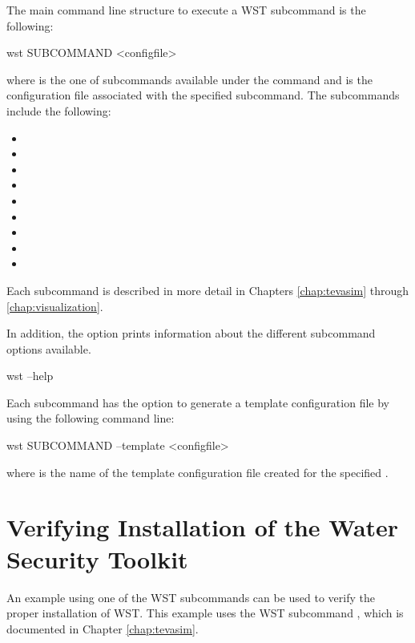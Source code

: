 The main command line structure to execute a WST subcommand is the following:
\begin{unknownListing}
wst SUBCOMMAND <configfile>
\end{unknownListing}
where  is the one of subcommands available under the 
 command and  is the configuration file associated 
with the specified subcommand. The subcommands include the following:
\begin{itemize}
\item {}
\item {}
\item {} 
\item {} 
\item {}
\item {}
\item {}
\item {}
\item {}
\end{itemize}
Each subcommand is described in more detail in Chapters \ref{chap:tevasim} 
through \ref{chap:visualization}.
 
In addition, the  option prints information 
about the different subcommand options available. 
\begin{unknownListing}
wst --help
\end{unknownListing}

Each subcommand has the option to generate a template configuration file by using 
the following command line:
\begin{unknownListing}
wst SUBCOMMAND --template <configfile>
\end{unknownListing}
where  is the name of the template configuration file created for 
the specified .

\section{Verifying Installation of the Water Security Toolkit}\label{simple_example}

An example using one of the WST subcommands can be used to verify 
the proper installation of WST. This example uses the WST subcommand , 
which is documented in Chapter \ref{chap:tevasim}.

